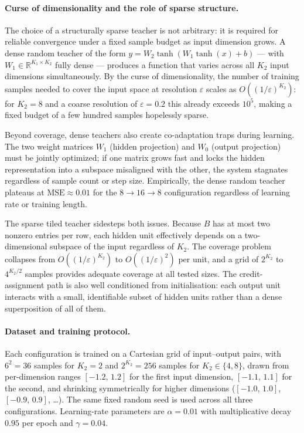 \documentclass{article}
\begin{document}
\paragraph{Curse of dimensionality and the role of sparse structure.}
The choice of a structurally sparse teacher is not arbitrary: it is required
for reliable convergence under a fixed sample budget as input dimension grows.
A dense random teacher of the form $y = W_2 \tanh(W_1 \tanh(x) + b)$ ---
with $W_1 \in \mathbb{R}^{K_1 \times K_2}$ fully dense --- produces a function
that varies across all $K_2$ input dimensions simultaneously.  By the curse of
dimensionality, the number of training samples needed to cover the input space
at resolution $\varepsilon$ scales as $O((1/\varepsilon)^{K_2})$: for $K_2=8$
and a coarse resolution of $\varepsilon=0.2$ this already exceeds $10^5$, making
a fixed budget of a few hundred samples hopelessly sparse.

Beyond coverage, dense teachers also create co-adaptation traps during learning.
The two weight matrices $W_1$ (hidden projection) and $W_0$ (output projection)
must be jointly optimized; if one matrix grows fast and locks the hidden
representation into a subspace misaligned with the other, the system stagnates
regardless of sample count or step size.  Empirically, the dense random teacher
plateaus at $\mathrm{MSE} \approx 0.01$ for the $8 \rightarrow 16 \rightarrow
8$ configuration regardless of learning rate or training length.

The sparse tiled teacher sidesteps both issues.  Because $B$ has at most two
nonzero entries per row, each hidden unit effectively depends on a
two-dimensional subspace of the input regardless of $K_2$.  The coverage
problem collapses from $O((1/\varepsilon)^{K_2})$ to $O((1/\varepsilon)^2)$
per unit, and a grid of $2^{K_2}$ to $4^{K_2/2}$ samples provides adequate
coverage at all tested sizes.  The credit-assignment path is also well
conditioned from initialisation: each output unit interacts with a small,
identifiable subset of hidden units rather than a dense superposition of all of
them.

\paragraph{Dataset and training protocol.}
Each configuration is trained on a Cartesian grid of input--output pairs,
with $6^2 = 36$ samples for $K_2=2$ and $2^{K_2}=256$ samples for $K_2 \in
\{4,8\}$, drawn from per-dimension ranges $[-1.2,\,1.2]$ for the first input
dimension, $[-1.1,\,1.1]$ for the second, and shrinking symmetrically for
higher dimensions ($[-1.0,\,1.0]$, $[-0.9,\,0.9]$, \ldots).  The same fixed
random seed is used across all three configurations.  Learning-rate parameters
are $\alpha=0.01$ with multiplicative decay $0.95$ per epoch and
$\gamma=0.04$.
\end{document}
